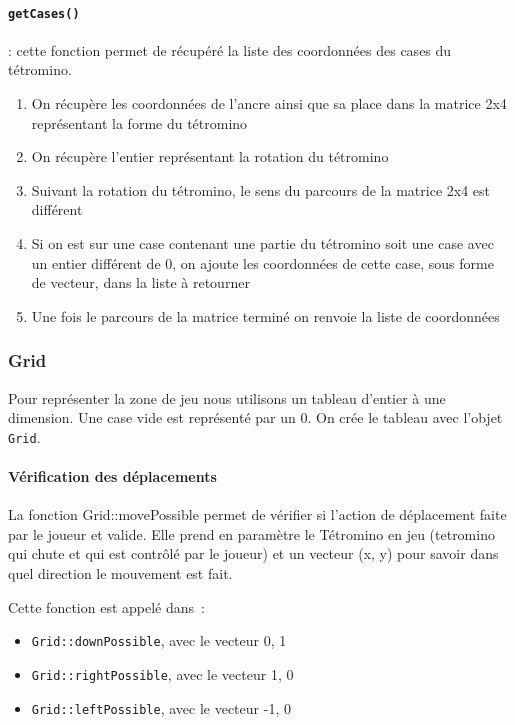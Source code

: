 \documentclass[a4paper, 12pt]{article}
\begin{document}
			\paragraph{ \texttt{getCases()}} :
			cette fonction permet de récupéré la liste des coordonnées des cases du tétromino.
			\begin{enumerate}

				\item On récupère les coordonnées de l’ancre ainsi que sa place dans la matrice 2x4 représentant la forme du tétromino
				\item On récupère l’entier représentant la rotation du tétromino
				\item Suivant la rotation du tétromino, le sens du parcours de la matrice 2x4 est différent
				\item Si on est sur une case contenant une partie du tétromino soit une case avec un entier différent de 0, on ajoute les coordonnées de cette case, sous forme de vecteur, dans la liste à retourner
				\item Une fois le parcours de la matrice terminé on renvoie la liste de coordonnées

			\end{enumerate}



		\subsubsection{Grid}
			Pour représenter la zone de jeu nous utilisons un tableau d’entier à une dimension. Une case vide est représenté par un 0. 
			On crée le tableau avec l’objet \texttt{Grid}.

			\paragraph{Vérification des déplacements}
				La fonction Grid::movePossible permet de vérifier si l’action de déplacement faite par le joueur et valide. Elle prend en paramètre le Tétromino en jeu (tetromino qui chute et qui est contrôlé par le joueur) et un vecteur (x, y) pour savoir dans quel direction le mouvement est fait.

				Cette fonction est appelé dans : 
				\begin{itemize}
					\item \texttt{Grid::downPossible}, avec le vecteur {0, 1}
					\item \texttt{Grid::rightPossible}, avec le vecteur {1, 0}
					\item \texttt{Grid::leftPossible}, avec le vecteur {-1, 0}
				\end{itemize}
\end{document}
